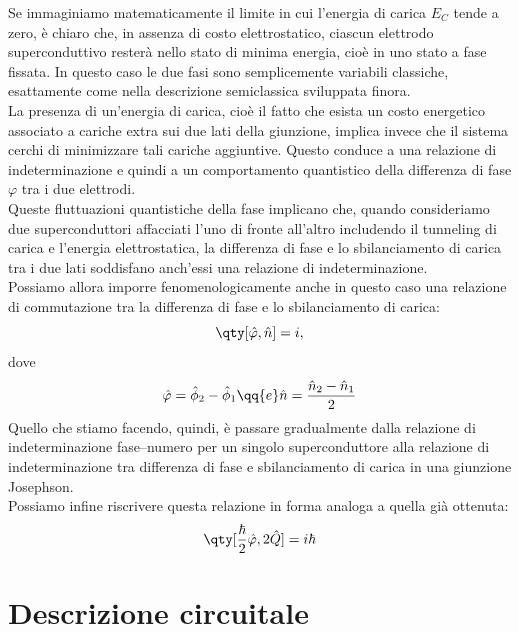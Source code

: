 Se immaginiamo matematicamente il limite in cui l'energia di carica $E_C$ tende a zero, è chiaro che, in assenza di costo elettrostatico, ciascun elettrodo superconduttivo resterà nello stato di minima energia, cioè in uno stato a fase fissata. In questo caso le due fasi sono semplicemente variabili classiche, esattamente come nella descrizione semiclassica sviluppata finora.\\
La presenza di un'energia di carica, cioè il fatto che esista un costo energetico associato a cariche extra sui due lati della giunzione, implica invece che il sistema cerchi di minimizzare tali cariche aggiuntive. Questo conduce a una relazione di indeterminazione e quindi a un comportamento quantistico della differenza di fase $\varphi$ tra i due elettrodi.\\
Queste fluttuazioni quantistiche della fase implicano che, quando consideriamo due superconduttori affacciati l'uno di fronte all'altro includendo il tunneling di carica e l'energia elettrostatica, la differenza di fase e lo sbilanciamento di carica tra i due lati soddisfano anch'essi una relazione di indeterminazione.\\
Possiamo allora imporre fenomenologicamente anche in questo caso una relazione di commutazione tra la differenza di fase e lo sbilanciamento di carica:
\begin{equation*}
    \qty[
        \hat{\varphi},
        \hat{n}
    ]
    =
    i,
\end{equation*}
dove
\begin{equation*}
    \hat{\varphi}=\hat{\phi}_2-\hat{\phi}_1
    \qq{e}
    \hat{n}=\frac{\hat{n}_2-\hat{n}_1}{2}
\end{equation*}
Quello che stiamo facendo, quindi, è passare gradualmente dalla relazione di indeterminazione fase--numero per un singolo superconduttore alla relazione di indeterminazione tra differenza di fase e sbilanciamento di carica in una giunzione Josephson.\\
Possiamo infine riscrivere questa relazione in forma analoga a quella già ottenuta:
\begin{equation*}
    \qty[ \frac{\hbar}{2}\hat{\varphi},2\hat{Q}]
    =i\hbar
\end{equation*}
\section{Descrizione circuitale}
